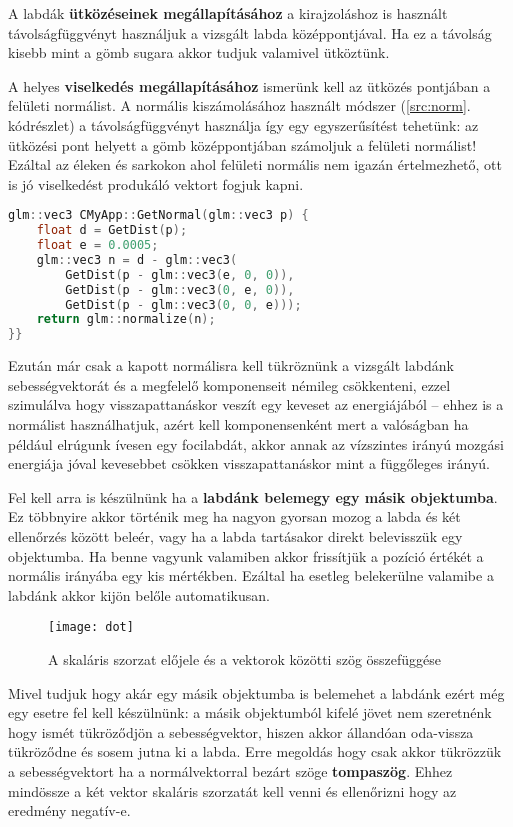 A labdák \textbf{ütközéseinek megállapításához} a kirajzoláshoz is használt távolságfüggvényt használjuk a vizsgált labda középpontjával. Ha ez a távolság kisebb mint a gömb sugara akkor tudjuk valamivel ütköztünk.

A helyes \textbf{viselkedés megállapításához} ismerünk kell az ütközés pontjában a felületi normálist. A normális kiszámolásához használt módszer (\ref{src:norm}. kódrészlet) a távolságfüggvényt használja így egy egyszerűsítést tehetünk: az ütközési pont helyett a gömb középpontjában számoljuk a felületi normálist! Ezáltal az éleken és sarkokon ahol felületi normális nem igazán értelmezhető, ott is jó viselkedést produkáló vektort fogjuk kapni.

\begin{lstlisting}[language={C++}]
glm::vec3 CMyApp::GetNormal(glm::vec3 p) {
	float d = GetDist(p);
	float e = 0.0005;
	glm::vec3 n = d - glm::vec3(
		GetDist(p - glm::vec3(e, 0, 0)),
		GetDist(p - glm::vec3(0, e, 0)),
		GetDist(p - glm::vec3(0, 0, e)));
	return glm::normalize(n);
}}
\end{lstlisting}

Ezután már csak a kapott normálisra kell tükröznünk a vizsgált labdánk sebességvektorát és a megfelelő komponenseit némileg csökkenteni, ezzel szimulálva hogy visszapattanáskor veszít egy keveset az energiájából -- ehhez is a normálist használhatjuk, azért kell komponensenként mert a valóságban ha például elrúgunk ívesen egy focilabdát, akkor annak az vízszintes irányú mozgási energiája jóval kevesebbet csökken visszapattanáskor mint a függőleges irányú. 

Fel kell arra is készülnünk ha a \textbf{labdánk belemegy egy másik objektumba}. Ez többnyire akkor történik meg ha nagyon gyorsan mozog a labda és két ellenőrzés között beleér, vagy ha a labda tartásakor direkt belevisszük egy objektumba. Ha benne vagyunk valamiben akkor frissítjük a pozíció értékét a normális irányába egy kis mértékben. Ezáltal ha esetleg belekerülne valamibe a labdánk akkor kijön belőle automatikusan.

\begin{figure}[H]
	\centering
	\texttt{[image: dot]}
	\caption{A skaláris szorzat előjele és a vektorok közötti szög összefüggése \cite{13DotPro51:online}}
	\label{fig:dot}
\end{figure}

Mivel tudjuk hogy akár egy másik objektumba is belemehet a labdánk ezért még egy esetre fel kell készülnünk: a másik objektumból kifelé jövet nem szeretnénk hogy ismét tükröződjön a sebességvektor, hiszen akkor állandóan oda-vissza tükröződne és sosem jutna ki a labda. Erre megoldás hogy csak akkor tükrözzük a sebességvektort ha a normálvektorral bezárt szöge \textbf{tompaszög}. Ehhez mindössze a két vektor skaláris szorzatát kell venni és ellenőrizni hogy az eredmény negatív-e.

